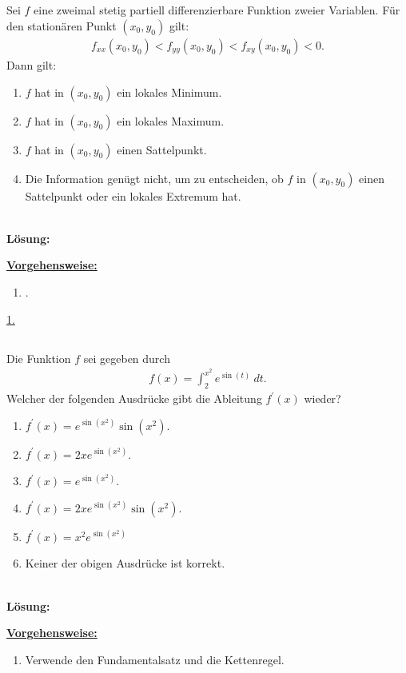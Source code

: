 \subsection*{}
Sei $ f $ eine zweimal stetig partiell differenzierbare Funktion zweier Variablen. Für den stationären Punkt $ (x_0,y_0) $ gilt:
\begin{align*}
	f_{xx}(x_0,y_0) < f_{yy}(x_0,y_0) < f_{xy}(x_0,y_0) < 0.
\end{align*} 
Dann gilt:
\renewcommand{\labelenumi}{(\alph{enumi})}
\begin{enumerate}
	\item $ f $ hat in $ (x_0,y_0) $ ein lokales Minimum.
	\item $ f $ hat in $ (x_0,y_0) $ ein lokales Maximum.
	\item $ f $ hat in $ (x_0,y_0) $ einen Sattelpunkt.
	\item Die Information genügt nicht, um zu entscheiden, ob $ f $ in $ (x_0,y_0) $ einen Sattelpunkt oder ein lokales Extremum hat.
\end{enumerate}
\ \\
\textbf{Lösung:}
\begin{mdframed}
	\underline{\textbf{Vorgehensweise:}}
	\renewcommand{\labelenumi}{\theenumi.}
	\begin{enumerate}
		\item .
	\end{enumerate}
\end{mdframed}
\underline{1. }\\
\newpage
\subsection*{}
Die Funktion $ f $ sei gegeben durch
\begin{align*}
	f(x) = \int_2^{x^2} e^{\sin(t)} \ dt.
\end{align*}
Welcher der folgenden Ausdrücke gibt die Ableitung $ f^\prime(x) $ wieder?
\renewcommand{\labelenumi}{(\alph{enumi})}
\begin{enumerate}
	\item 
	$ f^\prime(x) = e^{\sin(x^2)} \sin(x^2)$.
	\item 
	$ f^\prime(x) = 2 x e^{\sin(x^2)}$.
	\item 
	$ f^\prime(x) = e^{\sin(x^2)}$.
	\item
	$ f^\prime(x) = 2 x e^{\sin(x^2)} \sin(x^2)$.
	\item 
	$ f^\prime(x) = x^2 e^{\sin(x^2)}$ 
	\item 
	Keiner der obigen Ausdrücke ist korrekt.
\end{enumerate}
\ \\
\textbf{Lösung:}
\begin{mdframed}
\underline{\textbf{Vorgehensweise:}}
\renewcommand{\labelenumi}{\theenumi.}
\begin{enumerate}
\item Verwende den Fundamentalsatz und die Kettenregel.
\end{enumerate}
\end{mdframed}

